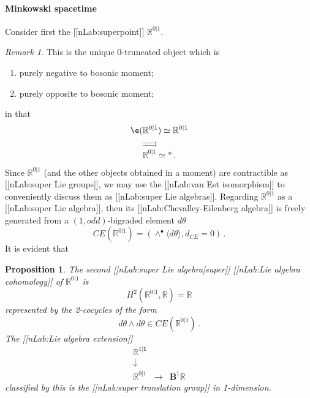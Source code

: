 \documentclass[12pt,titlepage]{article}
\newcommand{\itexarray}[1]{\begin{matrix}#1\end{matrix}}
\theoremstyle{plain}
\newtheorem{prop}{Proposition}
\theoremstyle{definition}
\theoremstyle{remark}
\newtheorem{remark}{Remark}
\begin{document}
\hypertarget{minkowski_spacetime}{}\paragraph*{{Minkowski spacetime}}\label{minkowski_spacetime}
Consider first the [[nLab:superpoint]] $\mathbb{R}^{0|1}$.
\begin{remark}
\label{}\hypertarget{}{}
This is the unique 0-truncated object which is
\begin{enumerate}%
\item purely negative to bosonic moment;
\item purely opposite to bosonic moment;
\end{enumerate}
in that
\begin{displaymath}
\e(\mathbb{R}^{0|1})\simeq \mathbb{R}^{0|1}
\end{displaymath}
\begin{displaymath}
\stackrel{\rightrightarrows}{\mathbb{R}^{0|1}} \simeq \ast
  \,.
\end{displaymath}
\end{remark}
Since $\mathbb{R}^{0|1}$ (and the other objects obtained in a moment) are contractible as [[nLab:super Lie groups]], we may use the [[nLab:van Est isomorphism]] to conveniently discuss them as [[nLab:super Lie algebras]]. Regarding $\mathbb{R}^{0\vert 1}$ as a [[nLab:super Lie algebra]], then its [[nLab:Chevalley-Eilenberg algebra]] is freely generated from a $(1,odd)$-bigraded element $d\theta$
\begin{displaymath}
CE(\mathbb{R}^{0\vert 1})
  =
  \left(
    \wedge^\bullet \langle d\theta \rangle, d_{CE} = 0
  \right)
  \,.
\end{displaymath}
It is evident that
\begin{prop}
\label{1dsuperMinkowskiFromInvariantExtension}\hypertarget{1dsuperMinkowskiFromInvariantExtension}{}
The second [[nLab:super Lie algebra|super]] [[nLab:Lie algebra cohomology]] of $\mathbb{R}^{0\vert 1}$ is
\begin{displaymath}
H^{2}(\mathbb{R}^{0\vert 1}, \mathbb{R})
  =
  \mathbb{R}
\end{displaymath}
represented by the 2-cocycles of the form
\begin{displaymath}
d\theta\wedge d\theta
  \in CE(\mathbb{R}^{0\vert 1})
  \,.
\end{displaymath}
The [[nLab:Lie algebra extension]]
\begin{displaymath}
\itexarray{
    \mathbb{R}^{1|\mathbf{1}}
    \\
    \downarrow
    \\
    \mathbb{R}^{0|1}
    &\stackrel{}{\longrightarrow}&
    \mathbf{B}^1 \mathbb{R}
  }
\end{displaymath}
classified by this is the [[nLab:super translation group]] in 1-dimension.
\end{prop}
\end{document}
